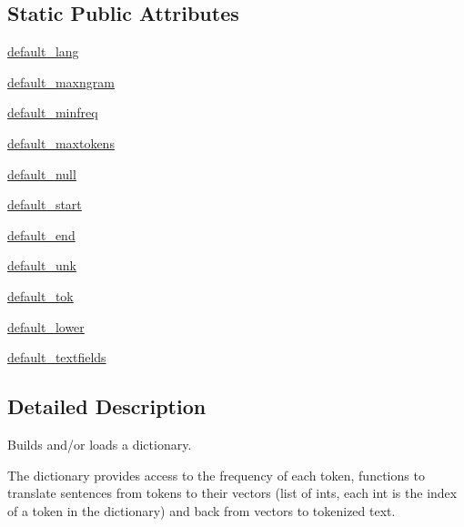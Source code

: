\subsection*{Static Public Attributes}
\begin{DoxyCompactItemize}
\item 
\hyperlink{classparlai_1_1agents_1_1legacy__agents_1_1seq2seq_1_1dict__v1_1_1DictionaryAgent_a9ff71d0329ca90a99adb68156f7e8a10}{default\+\_\+lang}
\item 
\hyperlink{classparlai_1_1agents_1_1legacy__agents_1_1seq2seq_1_1dict__v1_1_1DictionaryAgent_a68df546cc7db5a1f5730578c797d0205}{default\+\_\+maxngram}
\item 
\hyperlink{classparlai_1_1agents_1_1legacy__agents_1_1seq2seq_1_1dict__v1_1_1DictionaryAgent_a49c5cafbf78afa9420531738c3ece8e3}{default\+\_\+minfreq}
\item 
\hyperlink{classparlai_1_1agents_1_1legacy__agents_1_1seq2seq_1_1dict__v1_1_1DictionaryAgent_a96e4c6b95ad386b5989f88bb2285697c}{default\+\_\+maxtokens}
\item 
\hyperlink{classparlai_1_1agents_1_1legacy__agents_1_1seq2seq_1_1dict__v1_1_1DictionaryAgent_aa69d17cfb48231259503d87349df9235}{default\+\_\+null}
\item 
\hyperlink{classparlai_1_1agents_1_1legacy__agents_1_1seq2seq_1_1dict__v1_1_1DictionaryAgent_adb360d4d9b82036aa0ffa8a6703b3c5a}{default\+\_\+start}
\item 
\hyperlink{classparlai_1_1agents_1_1legacy__agents_1_1seq2seq_1_1dict__v1_1_1DictionaryAgent_a78c060b37f7fca9e5dd5c409560347f4}{default\+\_\+end}
\item 
\hyperlink{classparlai_1_1agents_1_1legacy__agents_1_1seq2seq_1_1dict__v1_1_1DictionaryAgent_a009796f97c4cc9b567ea893cd255d776}{default\+\_\+unk}
\item 
\hyperlink{classparlai_1_1agents_1_1legacy__agents_1_1seq2seq_1_1dict__v1_1_1DictionaryAgent_a673876b745eb145667a6a537b87cbf9a}{default\+\_\+tok}
\item 
\hyperlink{classparlai_1_1agents_1_1legacy__agents_1_1seq2seq_1_1dict__v1_1_1DictionaryAgent_a6dcadc2653dbc29c0d58131ee8563b07}{default\+\_\+lower}
\item 
\hyperlink{classparlai_1_1agents_1_1legacy__agents_1_1seq2seq_1_1dict__v1_1_1DictionaryAgent_a636ff59bfb5a047402d454ece6876d3f}{default\+\_\+textfields}
\end{DoxyCompactItemize}


\subsection{Detailed Description}
\begin{DoxyVerb}Builds and/or loads a dictionary.

The dictionary provides access to the frequency of each token, functions to
translate sentences from tokens to their vectors (list of ints, each int is the
index of a token in the dictionary) and back from vectors to tokenized text.
\end{DoxyVerb}
 

